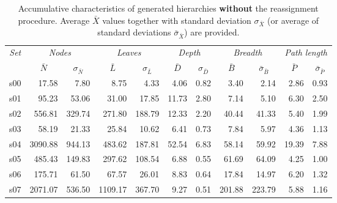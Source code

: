 \begin{table*}[b!]
\setlength{\tabcolsep}{3pt}
\begin{center}
\caption{Accumulative characteristics of generated hierarchies \textbf{without} the reassignment procedure. Average $\bar{X}$ values together with standard deviation $\sigma_{\bar{X}}$ (or average of standard deviations $\bar{\sigma}_{\bar{X}}$) are provided.\label{tab:quantitative-hierarchy-analysis}}
\begin{tabular}{crrrrrrrrrr}
\multirow{2}{*}{\textit{\small{Set}}} & \multicolumn{2}{c}{\textit{\small{Nodes}}} & \multicolumn{2}{c}{\textit{\small{Leaves}}} & \multicolumn{2}{c}{\textit{\small{Depth}}} & \multicolumn{2}{c}{\textit{\small{Breadth}}} & \multicolumn{2}{c}{\textit{\small{Path length}}} \\
& \multicolumn{1}{c}{$\bar{N}$} & \multicolumn{1}{c}{$\sigma_{\bar{N}}$} & \multicolumn{1}{c}{$\bar{L}$} & \multicolumn{1}{c}{$\sigma_{\bar{L}}$} & \multicolumn{1}{c}{$\bar{D}$} & \multicolumn{1}{c}{$\sigma_{\bar{D}}$} & \multicolumn{1}{c}{$\bar{B}$} & \multicolumn{1}{c}{$\bar{\sigma}_{\bar{B}}$} & \multicolumn{1}{c}{$\bar{P}$} & \multicolumn{1}{c}{$\bar{\sigma}_{\bar{P}}$} \\ 
\hline
s00 & 17.58 & 7.80 & 8.75 & 4.33 & 4.06 & 0.82 & 3.40 & 2.14 & 2.86 & 0.93 \\
s01 & 95.23 & 53.06 & 31.00 & 17.85 & 11.73 & 2.80 & 7.14 & 5.10 & 6.30 & 2.50 \\
s02 & 556.81 & 329.74 & 271.80 & 188.79 & 12.33 & 2.20 & 40.44 & 41.33 & 5.40 & 1.99 \\
s03 & 58.19 & 21.33 & 25.84 & 10.62 & 6.41 & 0.73 & 7.84 & 5.97 & 4.36 & 1.13 \\
s04 & 3090.88 & 944.13 & 483.62 & 187.81 & 52.54 & 6.83 & 58.14 & 59.92 & 19.39 & 7.88 \\
s05 & 485.43 & 149.83 & 297.62 & 108.54 & 6.88 & 0.55 & 61.69 & 64.09 & 4.25 & 1.00 \\
s06 & 175.71 & 61.50 & 67.57 & 26.01 & 8.83 & 0.64 & 17.84 & 14.97 & 6.20 & 1.32 \\
s07 & 2071.07 & 536.50 & 1109.17 & 367.70 & 9.27 & 0.51 & 201.88 & 223.79 & 5.88 & 1.16 \\
\end{tabular}
\end{center}
\end{table*}
